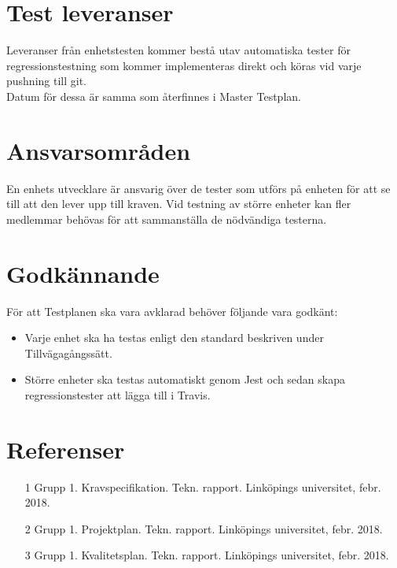 \documentclass[10pt]{article}
\begin{document}
\section{Test leveranser}

Leveranser från enhetstesten kommer bestå utav automatiska tester för regressionstestning som kommer implementeras direkt och köras vid varje pushning till git. 
\\
Datum för dessa är samma som återfinnes i Master Testplan.



\section{Ansvarsområden}
	En enhets utvecklare är ansvarig över de tester som utförs på enheten för att se till att den lever upp till kraven. Vid testning av större enheter kan fler medlemmar behövas för att sammanställa de nödvändiga testerna.
	
	
	
\section{Godkännande}
	För att Testplanen ska vara avklarad behöver följande vara godkänt:
	\begin{itemize}
	 \item Varje enhet ska ha testas enligt den standard beskriven under Tillvägagångssätt.
	 \item Större enheter ska testas automatiskt genom Jest och sedan skapa regressionstester att lägga till i Travis.
	\end{itemize}
	


\section{Referenser}
	\begin{itemize}
	\item [1] Grupp 1. Kravspecifikation. Tekn. rapport. Linköpings universitet, febr. 2018.
	\item [2] Grupp 1. Projektplan. Tekn. rapport. Linköpings universitet, febr. 2018.
	\item [3] Grupp 1. Kvalitetsplan. Tekn. rapport. Linköpings universitet, febr. 2018.
	\end{itemize}
	
\end{document}
